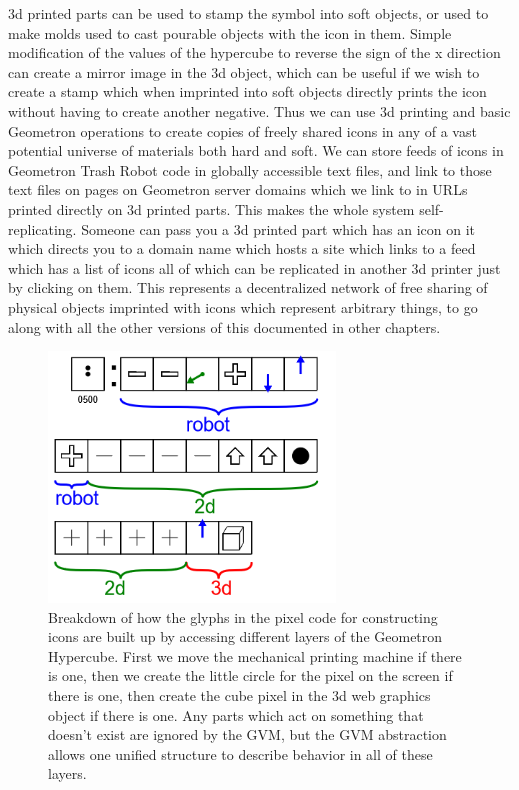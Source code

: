 3d printed parts can be used to stamp the symbol into soft objects, or used to make molds used to cast pourable objects with the icon in them.  Simple modification of the values of the hypercube to reverse the sign of the x direction can create a mirror image in the 3d object, which can be useful if we wish to create a stamp which when imprinted into soft objects directly prints the icon without having to create another negative.  Thus we can use 3d printing and basic Geometron operations to create copies of freely shared icons in any of a vast potential universe of materials both hard and soft.  We can store feeds of icons in Geometron Trash Robot code in globally accessible text files, and link to those text files on pages on Geometron server domains which we link to in URLs printed directly on 3d printed parts.  This makes the whole system self-replicating.  Someone can pass you a 3d printed part which has an icon on it which directs you to a domain name which hosts a site which links to a feed which has a list of icons all of which can be replicated in another 3d printer just by clicking on them.  This represents a decentralized network of free sharing of physical objects imprinted with icons which represent arbitrary things, to go along with all the other versions of this documented in other chapters.

\begin{figure}
	\centering
	\includegraphics[width=3in]{figures/geometron3d/robot0500.png}
	\caption[robot0500]
	{Breakdown of how the glyphs in the pixel code for constructing icons are built up by accessing different layers of the Geometron Hypercube.  First we move the mechanical printing machine if there is one, then we create the little circle for the pixel on the screen if there is one, then create the cube pixel in the 3d web graphics object if there is one.  Any parts which act on something that doesn't exist are ignored by the GVM, but the GVM abstraction allows one unified structure to describe behavior in all of these layers.}
\end{figure}

